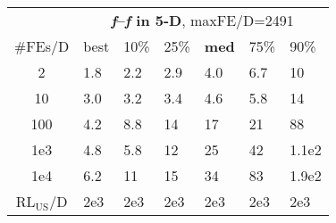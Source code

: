 \begin{tabular}{c|llllll}
 & \multicolumn{6}{|c}{\textbf{\textit{f}\raisebox{-0.35ex}{1}--\textit{f}\raisebox{-0.35ex}{24} in 5-D}, maxFE/D=2491}\\
\#FEs/D & best & 10\% & 25\% & \textbf{med} & 75\% & 90\%\\
2 & \hspace*{1ex}1.8 & \hspace*{1ex}2.2 & \hspace*{1ex}2.9 & \hspace*{1ex}4.0 & \hspace*{1ex}6.7 & 10\\
10 & \hspace*{1ex}3.0 & \hspace*{1ex}3.2 & \hspace*{1ex}3.4 & \hspace*{1ex}4.6 & \hspace*{1ex}5.8 & 14\\
100 & \hspace*{1ex}4.2 & \hspace*{1ex}8.8 & 14 & 17 & 21 & 88\\
1e3 & \hspace*{1ex}4.8 & \hspace*{1ex}5.8 & 12 & 25 & 42 & 1.1e2\\
1e4 & \hspace*{1ex}6.2 & 11 & 15 & 34 & 83 & 1.9e2\\
$\text{RL}_{\text{US}}$/D & 2e3 & 2e3 & 2e3 & 2e3 & 2e3 & 2e3
\end{tabular}
